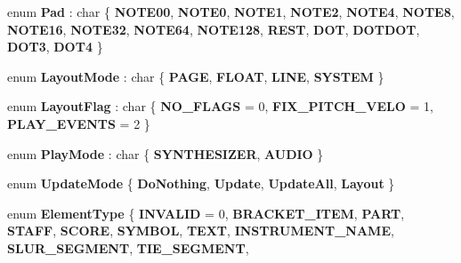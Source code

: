 \begin{DoxyCompactItemize}
enum {\bfseries Pad} \+: char \{ \newline
{\bfseries N\+O\+T\+E00}, 
{\bfseries N\+O\+T\+E0}, 
{\bfseries N\+O\+T\+E1}, 
{\bfseries N\+O\+T\+E2}, 
\newline
{\bfseries N\+O\+T\+E4}, 
{\bfseries N\+O\+T\+E8}, 
{\bfseries N\+O\+T\+E16}, 
{\bfseries N\+O\+T\+E32}, 
\newline
{\bfseries N\+O\+T\+E64}, 
{\bfseries N\+O\+T\+E128}, 
{\bfseries R\+E\+ST}, 
{\bfseries D\+OT}, 
\newline
{\bfseries D\+O\+T\+D\+OT}, 
{\bfseries D\+O\+T3}, 
{\bfseries D\+O\+T4}
 \}
\item 
\mbox{\label{namespace_ms_a9b1fb02f916c554309371c6513550a1b}} 
enum {\bfseries Layout\+Mode} \+: char \{ {\bfseries P\+A\+GE}, 
{\bfseries F\+L\+O\+AT}, 
{\bfseries L\+I\+NE}, 
{\bfseries S\+Y\+S\+T\+EM}
 \}
\item 
\mbox{\label{namespace_ms_ae95dea350de4a3014dbcbcfe9a6a75dc}} 
enum {\bfseries Layout\+Flag} \+: char \{ {\bfseries N\+O\+\_\+\+F\+L\+A\+GS} = 0, 
{\bfseries F\+I\+X\+\_\+\+P\+I\+T\+C\+H\+\_\+\+V\+E\+LO} = 1, 
{\bfseries P\+L\+A\+Y\+\_\+\+E\+V\+E\+N\+TS} = 2
 \}
\item 
\mbox{\label{namespace_ms_a2feae65fc65cd80432bdb886d484d22d}} 
enum {\bfseries Play\+Mode} \+: char \{ {\bfseries S\+Y\+N\+T\+H\+E\+S\+I\+Z\+ER}, 
{\bfseries A\+U\+D\+IO}
 \}
\item 
\mbox{\label{namespace_ms_a989afd8df761a943d5518ac5b31d4b18}} 
enum {\bfseries Update\+Mode} \{ {\bfseries Do\+Nothing}, 
{\bfseries Update}, 
{\bfseries Update\+All}, 
{\bfseries Layout}
 \}
\item 
\mbox{\label{namespace_ms_a2c92ce0204176ede1ab86e2f44ae6b9e}} 
enum {\bfseries Element\+Type} \{ \newline
{\bfseries I\+N\+V\+A\+L\+ID} = 0, 
{\bfseries B\+R\+A\+C\+K\+E\+T\+\_\+\+I\+T\+EM}, 
{\bfseries P\+A\+RT}, 
{\bfseries S\+T\+A\+FF}, 
\newline
{\bfseries S\+C\+O\+RE}, 
{\bfseries S\+Y\+M\+B\+OL}, 
{\bfseries T\+E\+XT}, 
{\bfseries I\+N\+S\+T\+R\+U\+M\+E\+N\+T\+\_\+\+N\+A\+ME}, 
\newline
{\bfseries S\+L\+U\+R\+\_\+\+S\+E\+G\+M\+E\+NT}, 
{\bfseries T\+I\+E\+\_\+\+S\+E\+G\+M\+E\+NT}, 

\end{DoxyCompactItemize}
